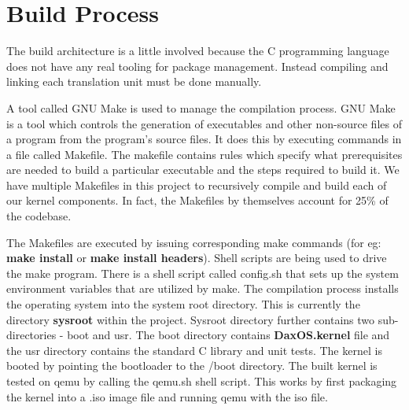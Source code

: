 \section{Build Process}
\begin{flushleft}
	The build architecture is a little involved because the C programming language
	does not have any real tooling for package management. Instead compiling and linking
	each translation unit must be done manually.
	\vspace{1.5 cm}
	
	A tool called GNU Make is used to manage the compilation process. GNU Make is a tool which
	controls the generation of executables and other non-source files of a program from the
	program's source files. It does this by executing commands in a file called Makefile.
	The makefile contains rules which specify what prerequisites are needed to build a particular
	executable and the steps required to build it. We have multiple Makefiles in this project to
	recursively compile and build each of our kernel components. In fact, the Makefiles by
	themselves account for 25\% of the codebase.
	\vspace{1.5 cm}
	
	The Makefiles are executed by issuing corresponding make commands (for eg: \textbf{make install} or
	\textbf{make install headers}). Shell scripts are being used to drive the make program. There is a shell
	script called config.sh that sets up the system environment variables that are utilized by make.
	The compilation process installs the operating system into the system root directory. This is currently the directory \textbf{sysroot} within the
	project. Sysroot directory further contains two sub-directories - boot and usr.
	The boot directory contains \textbf{DaxOS.kernel} file and the usr directory contains the standard C
	library and unit tests. The kernel is booted by pointing the bootloader to the /boot directory.
	The built kernel is tested on qemu by calling the qemu.sh shell script. This works by first
	packaging the kernel into a .iso image file and running qemu with the iso file.
	
\end{flushleft}
\pagebreak


